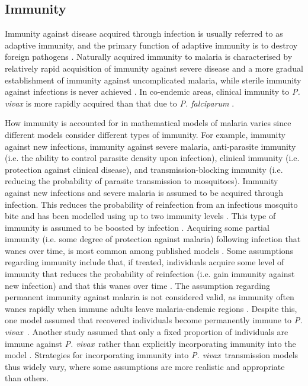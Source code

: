 \documentclass[12pt]{article}
\newcommand{\pv}{\textit{P. vivax}}
\begin{document}
\subsection{Immunity}
Immunity against disease acquired through infection is usually referred to as adaptive immunity, and the primary function of adaptive immunity is to destroy foreign pathogens \cite{mayer2010microbiology,chaffey2003alberts}. Naturally acquired immunity to malaria is characterised by relatively rapid acquisition of immunity against severe disease and a more gradual establishment of immunity against uncomplicated malaria, while sterile immunity against infections is never achieved \cite{barua2019impact,gruner2007sterile,mueller2013natural,lopez2017known}. In co-endemic areas, clinical immunity to \textit{P. vivax} is more rapidly acquired than that due to \textit{P. falciparum} \cite{mueller2013natural}. 

How immunity is accounted for in mathematical models of malaria varies since different models consider different types of immunity. For example, immunity against new infections, immunity against severe malaria, anti-parasite immunity (i.e. the ability to control parasite density upon infection), clinical immunity (i.e. protection against clinical disease), and transmission-blocking immunity (i.e. reducing the probability of parasite transmission to mosquitoes). Immunity against new infections and severe malaria is assumed to be acquired through infection. This reduces the probability of reinfection from an infectious mosquito bite and has been modelled using up to two immunity levels \cite{de1988modulation,de1991mathematical}. This type of immunity is assumed to be boosted by infection \cite{barua2019impact}. Acquiring some partial immunity (i.e. some degree of protection against malaria) following infection that wanes over time, is most common among published models \cite{kammanee2001basic,pongsumpun2007transmission,pongsumpun2008mathematical,pongsumpun2008plasmodium,pongsumpun2010impact,aguas2012modeling,chamchod2013modeling,kammanee2019mathematical,gebremichaelrelapse,gharakhanlou2019developing,tasman2022assessing}. Some assumptions regarding immunity include that, if treated, individuals acquire some level of immunity that reduces the probability of reinfection (i.e. gain immunity against new infection) and that this wanes over time \cite{roy2013potential,white2014modelling}. The assumption regarding permanent immunity against malaria is not considered valid, as immunity often wanes rapidly when immune adults leave malaria-endemic regions \cite{langhorne2008immunity}. Despite this, one model assumed that recovered individuals become permanently immune to \pv~\cite{aldila2021superinfection}. Another study assumed that only a fixed proportion of individuals are immune against \pv~rather than explicitly incorporating immunity into the model \cite{pizzitutti2015validated}. Strategies for incorporating immunity into \pv~transmission models thus widely vary, where some assumptions are more realistic and appropriate than others.
\end{document}
